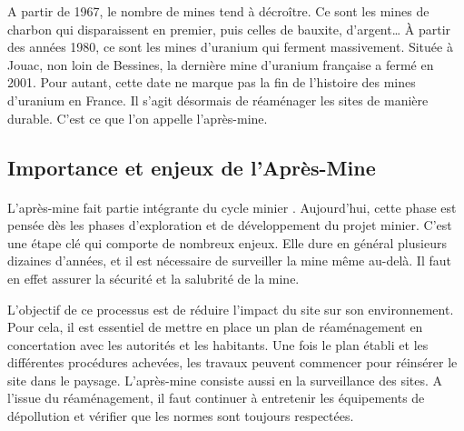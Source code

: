 \documentclass{article}
\begin{document}



A partir de 1967, le nombre de mines tend à décroître. Ce sont les mines de charbon qui disparaissent en premier, puis celles de bauxite, d’argent… À partir des années 1980, ce sont les mines d’uranium qui ferment massivement. Située à Jouac, non loin de Bessines, la dernière mine d’uranium française a fermé en 2001. Pour autant, cette date ne marque pas la fin de l’histoire des mines d’uranium en France. Il s’agit désormais de réaménager les sites de manière durable. C’est ce que l’on appelle l’après-mine.




\subsection{Importance et enjeux de l'Après-Mine}
\paragraph{} L’après-mine fait partie intégrante du cycle minier \cite{himeur_apres-mine_2020}. Aujourd’hui, cette phase est pensée dès les phases d’exploration et de développement du projet minier. C’est une étape clé qui comporte de nombreux enjeux. Elle dure en général plusieurs dizaines d’années, et il est nécessaire de surveiller la mine même au-delà. Il faut en effet assurer la sécurité et la salubrité de la mine.

L’objectif de ce processus est de réduire l’impact du site sur son environnement. Pour cela, il est essentiel de mettre en place un plan de réaménagement en concertation avec les autorités et les habitants. Une fois le plan établi et les différentes procédures achevées, les travaux peuvent commencer pour réinsérer le site dans le paysage. L’après-mine consiste aussi en la surveillance des sites. A l’issue du réaménagement, il faut continuer à entretenir les équipements de dépollution et vérifier que les normes sont toujours respectées.
\end{document}
